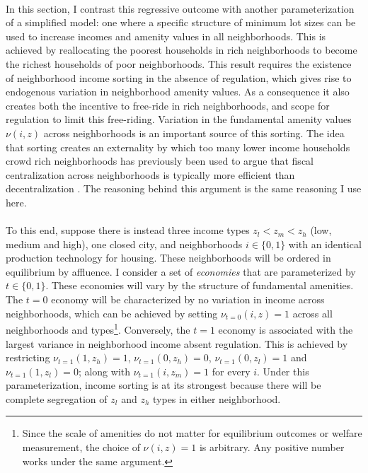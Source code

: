 \documentclass[12pt]{article}
\begin{document}
\paragraph*{}
In this section, I contrast this regressive outcome with another parameterization of a simplified model: one where a specific structure of minimum lot sizes can be used to increase incomes and amenity values in all neighborhoods. This is achieved by reallocating the poorest households in rich neighborhoods to become the richest households of poor neighborhoods. This result requires the existence of neighborhood income sorting in the absence of regulation, which gives rise to endogenous variation in neighborhood amenity values. As a consequence it also creates both the incentive to free-ride in rich neighborhoods, and scope for regulation to limit this free-riding. Variation in the fundamental amenity values $\nu(i, z)$ across neighborhoods is an important source of this sorting. The idea that sorting creates an externality by which too many lower income households crowd rich neighborhoods has previously been used to argue that fiscal centralization across neighborhoods is typically more efficient than decentralization \citep{ineffTiebout, calabresetal}. The reasoning behind this argument is the same reasoning I use here.

\paragraph*{}
To this end, suppose there is instead three income types $z_{l} < z_{m} < z_{h}$ (low, medium and high), one closed city, and neighborhoods $i \in \{0, 1\}$ with an identical production technology for housing. These neighborhoods will be ordered in equilibrium by affluence. I consider a set of \textit{economies} that are parameterized by $t \in \{0, 1\}$. These economies will vary by the structure of fundamental amenities. The $t = 0$ economy will be characterized by no variation in income across neighborhoods, which can be achieved by setting $\nu_{t = 0}(i, z) = 1$ across all neighborhoods and types\footnote{Since the scale of amenities do not matter for equilibrium outcomes or welfare measurement, the choice of $\nu(i, z) = 1$ is arbitrary. Any positive number works under the same argument.}. Conversely, the $t = 1$ economy is associated with the largest variance in neighborhood income absent regulation. This is achieved by restricting $\nu_{t = 1}(1, z_{h}) = 1$, $\nu_{t = 1}(0, z_{h}) = 0$, $\nu_{t = 1}(0, z_{l}) = 1$ and $\nu_{t = 1}(1, z_{l}) = 0$; along with $\nu_{t = 1}(i, z_{m}) = 1$ for every $i$. Under this parameterization, income sorting is at its strongest because there will be complete segregation of $z_{l}$ and $z_{h}$ types in either neighborhood.  
\end{document}
